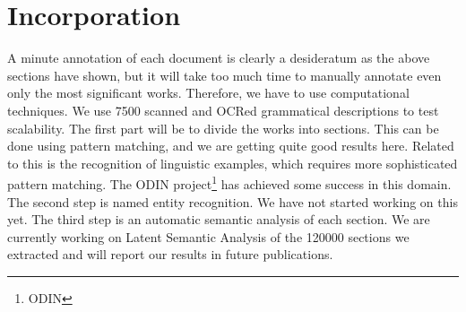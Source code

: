 \documentclass[a4paper,10pt]{article}
\begin{document}
\section{Incorporation}
A minute annotation of each document is clearly a desideratum as the above sections have shown, but it will take too much time to manually annotate even only the most significant works. Therefore, we have to use computational techniques. We use 7500 scanned and OCRed grammatical descriptions to test scalability. The first part will be to divide the works into sections. This can be done using pattern matching, and we are getting quite good results here. Related to this is the recognition of linguistic examples, which requires more sophisticated pattern matching. The ODIN project\footnote{ODIN} has achieved some success in this domain. The second step is named entity recognition. We have not started working on this yet. The third step is an automatic semantic analysis of each section. We are currently working on Latent Semantic Analysis \citep{DeerwesterEtAl1990} of the 120000 sections we extracted and will report our results in future publications.
% 
% 
% 
% 
% 
\end{document}
